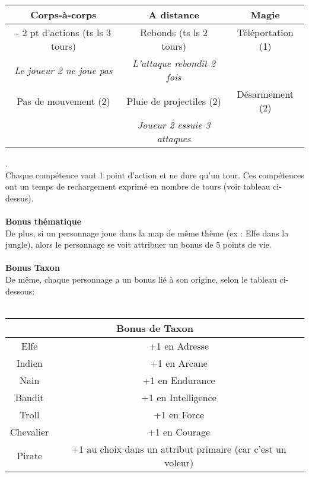 \documentclass[a4paper,12pt]{report}
\begin{document}
	\begin{tabular}{|c|c|c|} 
		
		\hline
		\textbf{Corps-à-corps} & \textbf{A distance} & \textbf{Magie} \\
		\hline
		- 2 pt d'actions (ts ls 3 tours) & Rebonds (ts ls 2 tours) &Téléportation (1) \\
		\textit{Le joueur 2 ne joue pas} & \textit{L'attaque rebondit 2 fois} &  \\
		\hline
		Pas de mouvement (2)& Pluie de projectiles (2) & Désarmement (2) \\
		& \textit{Joueur 2 essuie 3 attaques} & \\
		\hline
	\end{tabular}
	. \\
	
	Chaque compétence vaut 1 point d'action et ne dure qu'un tour. Ces compétences ont un temps de rechargement exprimé en nombre de tours (voir tableau ci-dessus). \\ \\
	\textbf{Bonus thématique}\\
	De plus, si un personnage joue dans la map de même thème (ex : Elfe dans la jungle), alors le personnage se voit attribuer un bonus de 5 points de vie. \\ \\
	\textbf{Bonus Taxon} \\ 
	De même, chaque personnage a un bonus lié à son origine, selon le tableau ci-dessous: \\ \\
	
	
	\begin{tabular}{|c|c|}
		\hline
		\multicolumn{2}{|c|}{Bonus de Taxon} \\
		\hline
		Elfe &  +1 en Adresse \\
		\hline
		Indien & +1 en Arcane \\
		\hline
		Nain & +1 en Endurance \\
		\hline
		Bandit & +1 en  Intelligence\\
		\hline
		Troll & +1 en Force \\
		\hline
		Chevalier & +1 en Courage \\
		\hline
		Pirate & +1 au choix dans un attribut primaire (car c'est un voleur)\\
		\hline
	\end{tabular}

	
	
	
	
\end{document}
